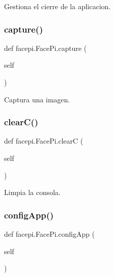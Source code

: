 Gestiona el cierre de la aplicacion. 

\mbox{\label{classfacepi_1_1_face_pi_aa6a20d44bd85ecbf4aaa6390707e9ffe}} 
\subsubsection{\texorpdfstring{capture()}{capture()}}
{\footnotesize\ttfamily def facepi.\+Face\+Pi.\+capture (\begin{DoxyParamCaption}\item[{}]{self }\end{DoxyParamCaption})}



Captura una imagen. 

\mbox{\label{classfacepi_1_1_face_pi_a8e4d19c4f06839b99a061844243668bd}} 
\subsubsection{\texorpdfstring{clear\+C()}{clearC()}}
{\footnotesize\ttfamily def facepi.\+Face\+Pi.\+clearC (\begin{DoxyParamCaption}\item[{}]{self }\end{DoxyParamCaption})}



Limpia la consola. 

\mbox{\label{classfacepi_1_1_face_pi_a6ef1408ba24ad470f358594e60b9a85a}} 
\subsubsection{\texorpdfstring{config\+App()}{configApp()}}
{\footnotesize\ttfamily def facepi.\+Face\+Pi.\+config\+App (\begin{DoxyParamCaption}\item[{}]{self }\end{DoxyParamCaption})}



